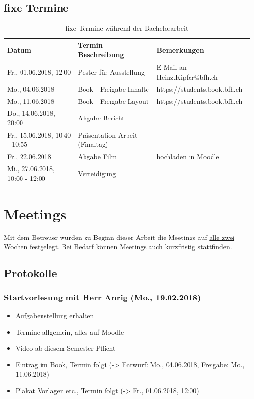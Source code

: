 \subsection{fixe Termine}
\begin{table}[H]
	\centering
	\begin{tabular}{lll} \toprule
		\textbf{Datum} 			& \textbf{Termin Beschreibung}		& \textbf{Bemerkungen}		\\ \midrule
		Fr., 01.06.2018, 12:00		& Poster für Ausstellung 		& E-Mail an Heinz.Kipfer@bfh.ch	\\ \midrule
		Mo., 04.06.2018 		& Book - Freigabe Inhalte		& https://students.book.bfh.ch	\\ \midrule
		Mo., 11.06.2018 		& Book - Freigabe Layout		& https://students.book.bfh.ch	\\ \midrule
		Do., 14.06.2018, 20:00		& Abgabe Bericht			&  				\\ \midrule
		Fr., 15.06.2018, 10:40 - 10:55	& Präsentation Arbeit (Finaltag)	&  				\\ \midrule
		Fr., 22.06.2018			& Abgabe Film				& hochladen in Moodle		\\ \midrule
		Mi., 27.06.2018, 10:00 - 12:00	& Verteidigung				&				\\ \bottomrule
	\end{tabular}
	\caption{fixe Termine während der Bachelorarbeit}
	\label{tab:fixeTermine}
\end{table}


\section{Meetings}
Mit dem Betreuer wurden zu Beginn dieser Arbeit die Meetings auf \underline{alle zwei Wochen} festgelegt. Bei Bedarf können Meetings auch kurzfristig stattfinden.
\subsection{Protokolle}
\subsubsection{Startvorlesung mit Herr Anrig (Mo., 19.02.2018)}
\begin{itemize}
	\item Aufgabenstellung erhalten
	\item Termine allgemein, alles auf Moodle
	\item Video ab diesem Semester Pflicht
	\item Eintrag im Book, Termin folgt (-> Entwurf: Mo., 04.06.2018, Freigabe: Mo., 11.06.2018)
	\item Plakat Vorlagen etc., Termin folgt (-> Fr., 01.06.2018, 12:00)
\end{itemize}

